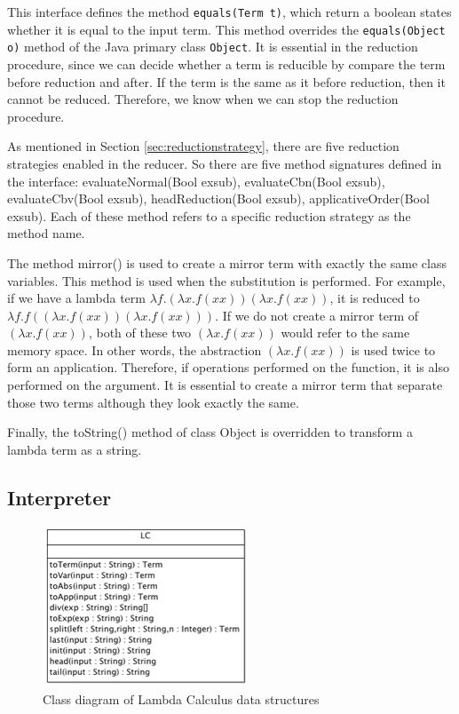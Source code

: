 \documentclass[a4paper,11pt,twoside]{report}
\begin{document}
This interface defines the method \verb|equals(Term t)|, which return a boolean states whether it is equal to the input term. This method overrides the \verb|equals(Object o)| method of the Java primary class \verb|Object|. It is essential in the reduction procedure, since we can decide whether a term is reducible by compare the term before reduction and after. If the term is the same as it before reduction, then it cannot be reduced. Therefore, we know when we can stop the reduction procedure.  

As mentioned in Section \ref{sec:reductionstrategy}, there are five reduction strategies enabled in the reducer. So there are five method signatures defined in the interface: \textsf{evaluateNormal(Bool exsub), evaluateCbn(Bool exsub), evaluateCbv(Bool exsub), headReduction(Bool exsub), applicativeOrder(Bool exsub)}. Each of these method refers to a specific reduction strategy as the method name. 

The method \textsf{mirror()} is used to create a mirror term with exactly the same class variables. This method is used when the substitution is performed. For example, if we have a lambda term $\lambda f.(\lambda x.f(xx))(\lambda x.f(xx))$, it is reduced to $\lambda f.f((\lambda x.f(xx))(\lambda x.f(xx)))$. If we do not create a mirror term of $(\lambda x.f(xx))$, both of these two $(\lambda x.f(xx))$ would refer to the same memory space. In other words, the abstraction $(\lambda x.f(xx))$ is used twice to form an application. Therefore, if operations performed on the function, it is also performed on the argument. It is essential to create a mirror term that separate those two terms although they look exactly the same.      

Finally, the \textsf{toString()} method of class \textsf{Object} is overridden to transform a lambda term as a string.  

\subsection{Interpreter}

\begin{figure}
\centering
\includegraphics[scale=0.6]{LC}
\caption{Class diagram of Lambda Calculus data structures}
\label{fig:term1}
\end{figure}
\end{document}
